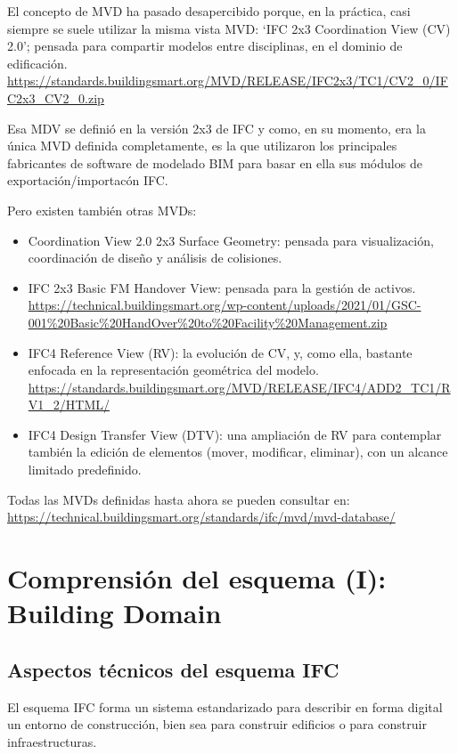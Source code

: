 \documentclass[spanish,10pt,a4paper,final,oneside]{article}
\begin{document}
El concepto de MVD ha pasado desapercibido porque, en la práctica, casi siempre se suele utilizar la misma vista MVD:  `IFC 2x3 Coordination View (CV) 2.0'; pensada para compartir modelos entre disciplinas, en el dominio de edificación. \url{https://standards.buildingsmart.org/MVD/RELEASE/IFC2x3/TC1/CV2_0/IFC2x3_CV2_0.zip}

Esa MDV se definió en la versión 2x3 de IFC y como, en su momento, era la única MVD definida completamente, es la que utilizaron los principales fabricantes de software de modelado BIM para basar en ella sus módulos de exportación/importacón IFC.

Pero  existen también otras MVDs:
\begin{itemize}
\item Coordination View 2.0 2x3 Surface Geometry: pensada para visualización, coordinación de diseño y análisis de colisiones.
\item IFC 2x3 Basic FM Handover View: pensada para la gestión de activos.
\\ \url{https://technical.buildingsmart.org/wp-content/uploads/2021/01/GSC-001%20Basic%20HandOver%20to%20Facility%20Management.zip}
\item IFC4 Reference View (RV): la evolución de CV, y, como ella, bastante enfocada en la representación geométrica del modelo.
\\ \url{https://standards.buildingsmart.org/MVD/RELEASE/IFC4/ADD2_TC1/RV1_2/HTML/}
\item IFC4 Design Transfer View (DTV): una ampliación de RV para contemplar también la edición de elementos (mover, modificar, eliminar), con un alcance limitado predefinido.
\end{itemize}

Todas las MVDs definidas hasta ahora se pueden consultar en: \url{https://technical.buildingsmart.org/standards/ifc/mvd/mvd-database/}





\newpage
\section{Comprensión del esquema (I): Building Domain}

\subsection{Aspectos técnicos del esquema IFC}
El esquema IFC forma un sistema estandarizado para describir en forma digital un entorno de construcción, bien sea para construir edificios o para construir infraestructuras.
\end{document}
